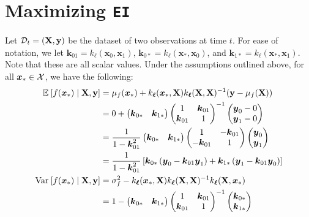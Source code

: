 \documentclass[11pt]{article}
\def\EI{\texttt{EI}}
\newcommand{\bs}[1]{\boldsymbol{#1}}
\def\bsx{\bs{x}}
\def\bsy{\bs{y}}
\def\bsk{\bs{k}}
\def\bell{\bs{\ell}}
\def\xast{\bsx_{*}}
\begin{document}
\newpage

\section{Maximizing \EI}

Let $\mathcal{D}_{t} = (\mathbf{X}, \mathbf{y})$ be the dataset of two observations at time $t$. For ease of notation, we let $\bsk_{01} = k_{\bell}(\bsx_{0}, \bsx_{1})$, $\bsk_{0*} = k_{\bell}(\xast, \bsx_{0})$, and $\bsk_{1*} = k_{\bell}(\xast, \bsx_{1})$. Note that these are all scalar values. Under the assumptions outlined above, for all $\xast \in \calX$, we have the following:
\begin{align*}
\expec{f(\xast) \mid \mathbf{X}, \mathbf{y}} &= \mu_{f}(\xast) + k_{\bell}(\xast, \mathbf{X})k_{\bell}(\mathbf{X}, \mathbf{X})^{-1}(\mathbf{y} - \mu_{f}(\mathbf{X}))\\
&= 0 + \begin{pmatrix}\bsk_{0*} & \bsk_{1*}\end{pmatrix}\begin{pmatrix}1 & \bsk_{01}\\ \bsk_{01} & 1\end{pmatrix}^{-1}\begin{pmatrix}\bsy_0 - 0\\ \bsy_{1} - 0\end{pmatrix}\\
&= \frac{1}{1 - \bsk_{01}^2}\begin{pmatrix}\bsk_{0*} & \bsk_{1*}\end{pmatrix}\begin{pmatrix}1 & -\bsk_{01}\\ -\bsk_{01} & 1\end{pmatrix}\begin{pmatrix}\bsy_0\\ \bsy_{1}\end{pmatrix}\\
&= \frac{1}{1 - \bsk_{01}^2}\left[\bsk_{0*}\left(\bsy_{0} - \bsk_{01}\bsy_{1}\right) + \bsk_{1*}\left(\bsy_{1} - \bsk_{01}\bsy_{0}\right)\right]\\
\var{f(\xast) \mid \mathbf{X}, \mathbf{y}} &= \sigma_{f}^{2} - k_{\bell}(\xast, \mathbf{X})k_{\bell}(\mathbf{X}, \mathbf{X})^{-1}k_{\bell}(\mathbf{X}, \xast)\\
&= 1 - \begin{pmatrix}\bsk_{0*} & \bsk_{1*}\end{pmatrix}\begin{pmatrix}1 & \bsk_{01}\\ \bsk_{01} & 1\end{pmatrix}^{-1}\begin{pmatrix}\bsk_{0*}\\ \bsk_{1*}\end{pmatrix}\\

\end{align*}
\end{document}
